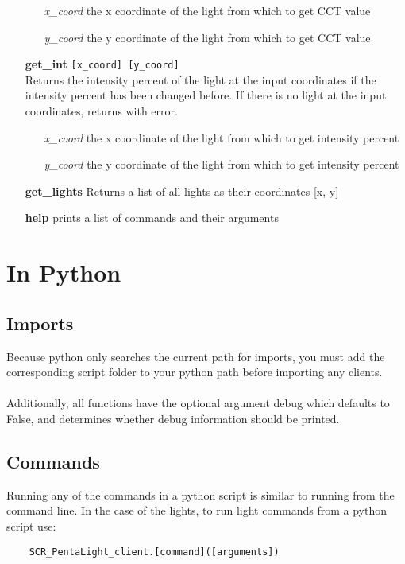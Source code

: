 \documentclass[twoside]{article}
\begin{document}
\begin{enumerate}
		\begin{enumerate}[leftmargin=3\parindent]
			\item[{\it x\_coord}] the x coordinate of the light from which to get CCT value
			\item[{\it y\_coord}] the y coordinate of the light from which to get CCT value
		\end{enumerate}
		
		\item[\bf get\_int] \verb|[x_coord] [y_coord]|\\
		Returns the intensity percent of the light at the input coordinates if the intensity percent has been changed before.
		If there is no light at the input coordinates, returns with error.
		
		\begin{enumerate}[leftmargin=3\parindent]
			\item[{\it x\_coord}] the x coordinate of the light from which to get intensity percent
			\item[{\it y\_coord}] the y coordinate of the light from which to get intensity percent
		\end{enumerate}
	
		\item[\bf get\_lights]
		Returns a list of all lights as their coordinates [x, y]
			
		\item[\bf help] prints a list of commands and their arguments
		
	\end{enumerate}

 	\section{In Python}


	\subsection{Imports}
	Because python only searches the current path for imports, you must add the corresponding script folder to your python path before importing any clients. \\ \\
	Additionally, all functions have the optional argument debug which defaults to False, and determines whether debug information should be printed.

	\subsection{Commands}
	Running any of the commands in a python script is similar to running from the command line. In the case of the lights, to run light commands from a python script use:
	\begin{verbatim}
	SCR_PentaLight_client.[command]([arguments])
	\end{verbatim}
	
\end{document}
